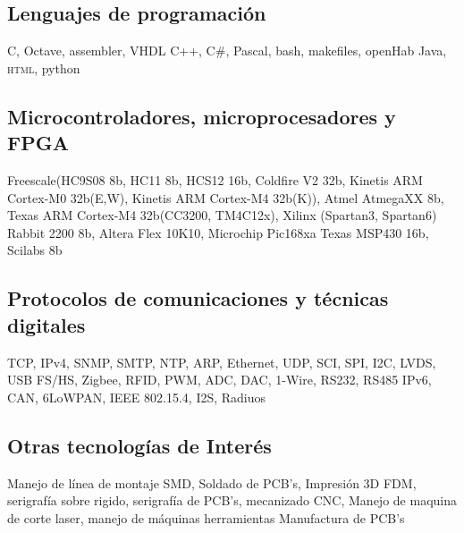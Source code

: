 \documentclass[11pt,a4paper,sans]{moderncv} 	%
\begin{document}
	\subsection{Lenguajes de programación}
	 	{C, Octave, assembler, VHDL}
	 	{C++, C\#, Pascal, bash, makefiles, openHab}
	 	{Java, \textsc{html}, python}

	\subsection{Microcontroladores, microprocesadores y FPGA}
	 	{Freescale(HC9S08 8b, HC11 8b, HCS12 16b, Coldfire V2 32b, Kinetis ARM Cortex-M0 32b(E,W), Kinetis ARM Cortex-M4 32b(K)), Atmel AtmegaXX 8b, Texas ARM Cortex-M4 32b(CC3200, TM4C12x), Xilinx (Spartan3, Spartan6)}
	 	{Rabbit 2200 8b, Altera Flex 10K10, Microchip Pic168xa}
	 	{Texas MSP430 16b, Scilabs 8b}
	
	\subsection{Protocolos de comunicaciones y técnicas digitales}
	 	{TCP, IPv4, SNMP, SMTP, NTP, ARP, Ethernet, UDP, SCI, SPI, I2C, LVDS, USB FS/HS, Zigbee, RFID, PWM, ADC, DAC, 1-Wire, RS232, RS485}
	 	{IPv6, CAN, 6LoWPAN, IEEE 802.15.4, I2S, Radiuos}
	 	{}
	
	\subsection{Otras tecnologías de Interés}
	 	{Manejo de línea de montaje SMD, Soldado de PCB's, Impresión 3D FDM, serigrafía sobre rigido, serigrafía de PCB's,  mecanizado CNC, Manejo de maquina de corte laser, manejo de máquinas herramientas}
	 	{Manufactura de PCB's}
	 	{}

\end{document}
